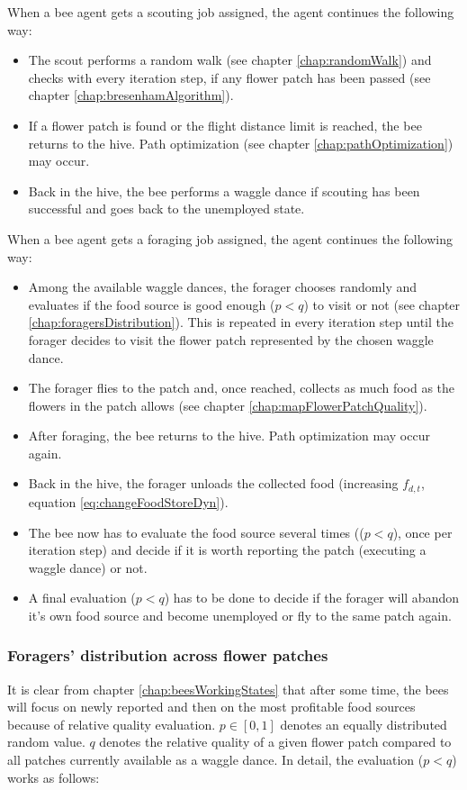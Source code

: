 			When a bee agent gets a scouting job assigned, the agent continues the following way:
			\begin{itemize}
				\item The scout performs a random walk (see chapter \ref{chap:randomWalk}) and checks with every iteration step, if any flower patch has been passed (see chapter \ref{chap:bresenhamAlgorithm}).
				\item If a flower patch is found or the flight distance limit is reached, the bee returns to the hive. Path optimization (see chapter \ref{chap:pathOptimization}) may occur.
				\item Back in the hive, the bee performs a waggle dance if scouting has been successful and goes back to the unemployed state.\\
			\end{itemize}
			
			When a bee agent gets a foraging job assigned, the agent continues the following way:
			\begin{itemize}
				\item Among the available waggle dances, the forager chooses randomly and evaluates if the food source is good enough ($p < q$) to visit or not (see chapter \ref{chap:foragersDistribution}). This is repeated in every iteration step until the forager decides to visit the flower patch represented by the chosen waggle dance.
				\item The forager flies to the patch and, once reached, collects as much food as the flowers in the patch allows (see chapter \ref{chap:mapFlowerPatchQuality}).
				\item After foraging, the bee returns to the hive. Path optimization may occur again.
				\item Back in the hive, the forager unloads the collected food (increasing $f_{d,t}$, equation \ref{eq:changeFoodStoreDyn}).
				\item The bee now has to evaluate the food source several times (($p < q$), once per iteration step) and decide if it is worth reporting the patch (executing a waggle dance) or not.
				\item A final evaluation ($p < q$) has to be done to decide if the forager will abandon it's own food source and become unemployed or fly to the same patch again.
			\end{itemize}
	
		
		\subsubsection{Foragers' distribution across flower patches}
			It is clear from chapter \ref{chap:beesWorkingStates} that after some time, the bees will focus on newly reported and then on the most profitable food sources because of relative quality evaluation. $p \in {[0,1]}$ denotes an equally distributed random value. $q$ denotes the relative quality of a given flower patch compared to all patches currently available as a waggle dance. In detail, the evaluation ($p < q$) works as follows:
		
